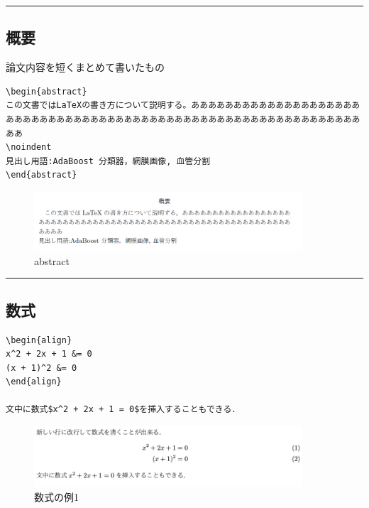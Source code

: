 \begin{center}\rule{0.5\linewidth}{\linethickness}\end{center}

\hypertarget{ux6982ux8981}{\subsection{概要}\label{ux6982ux8981}}

論文内容を短くまとめて書いたもの

\begin{lstlisting}
\begin{abstract}
この文書ではLaTeXの書き方について説明する。ああああああああああああああああああああああああああああああああああああああああああああああああああああああああああああああああ
\noindent
見出し用語:AdaBoost 分類器，網膜画像, 血管分割
\end{abstract}
\end{lstlisting}

\begin{figure}[htbp]
\centering
\includegraphics[width=10.00000cm]{./figures/abstract.png}
\caption{abstract}
\end{figure}

\begin{center}\rule{0.5\linewidth}{\linethickness}\end{center}

\hypertarget{ux6570ux5f0f}{\subsection{数式}\label{ux6570ux5f0f}}

\begin{lstlisting}
\begin{align}
x^2 + 2x + 1 &= 0
(x + 1)^2 &= 0
\end{align}

文中に数式$x^2 + 2x + 1 = 0$を挿入することもできる．
\end{lstlisting}

\begin{figure}[htbp]
\centering
\includegraphics[width=10.00000cm]{./figures/align.png}
\caption{数式の例1}
\end{figure}

